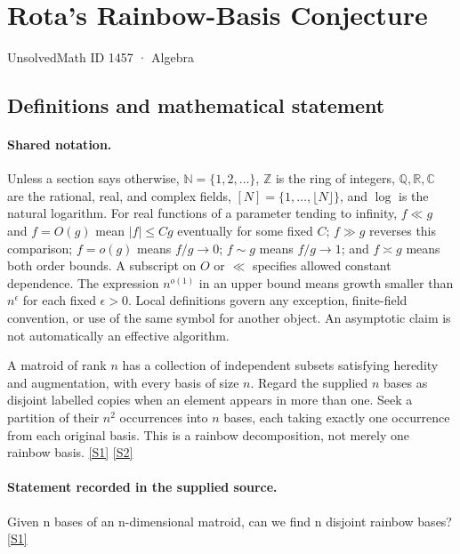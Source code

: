 \documentclass[11pt,a4paper]{article}
\newcommand{\N}{\mathbb{N}}
\newcommand{\Z}{\mathbb{Z}}
\newcommand{\Q}{\mathbb{Q}}
\newcommand{\R}{\mathbb{R}}
\newcommand{\C}{\mathbb{C}}
\newcommand{\sref}[2]{\hyperlink{source:#1:#2}{[S#2]}}
\begin{document}

\setcounter{section}{1456}

\section{Rota’s Rainbow-Basis Conjecture}\label{1457}

{\small\sffamily UnsolvedMath ID 1457 · Algebra}

\subsection{Definitions and mathematical statement}

\paragraph{Shared notation.}Unless a section says otherwise, $\N=\{1,2,\ldots\}$,
$\Z$ is the ring of integers, $\Q,\R,\C$ are the rational, real, and complex
fields, $[N]=\{1,\ldots,\lfloor N\rfloor\}$, and $\log$ is the natural
logarithm. For real functions of a parameter tending to infinity,
$f\ll g$ and $f=O(g)$ mean $|f|\leq Cg$ eventually for some fixed $C$;
$f\gg g$ reverses this comparison; $f=o(g)$ means $f/g\to0$;
$f\sim g$ means $f/g\to1$; and $f\asymp g$ means both order bounds.
A subscript on $O$ or $\ll$ specifies allowed constant dependence.
The expression $n^{o(1)}$ in an upper bound means growth smaller than
$n^\epsilon$ for each fixed $\epsilon>0$. Local definitions govern any
exception, finite-field convention, or use of the same symbol for another
object. An asymptotic claim is not automatically an effective algorithm.



A matroid of rank $n$ has a collection of independent subsets satisfying heredity and augmentation, with every basis of size $n$. Regard the supplied $n$ bases as disjoint labelled copies when an element appears in more than one. Seek a partition of their $n^2$ occurrences into $n$ bases, each taking exactly one occurrence from each original basis. This is a rainbow decomposition, not merely one rainbow basis. \sref{1457}{1} \sref{1457}{2}

\paragraph{Statement recorded in the supplied source.}
Given n bases of an n-dimensional matroid, can we find n disjoint rainbow bases? \sref{1457}{1}
\end{document}
